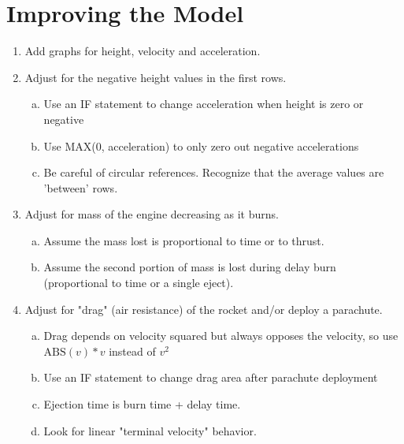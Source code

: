 \documentclass [12pt, letterpaper, titlepage] {article}
\begin{document}
\section*{Improving the Model}
\begin{enumerate}
        	\item{Add graphs for height, velocity and acceleration.}
	\item{Adjust for the negative height values in the first rows.}
	\begin{enumerate}[a.]
		\item{Use an IF statement to change acceleration when height is zero or negative}
		\item{Use MAX(0, acceleration) to only zero out negative accelerations}
		\item{Be careful of circular references. Recognize that the average values are 'between' rows.}
	\end{enumerate}
	\item{Adjust for mass of the engine decreasing as it burns.}
	\begin{enumerate}[a.]
		\item{Assume the mass lost is proportional to time or to thrust.}
		\item{Assume the second portion of mass is lost during delay burn (proportional to time or a single eject).}
	\end{enumerate}
	\item{Adjust for "drag" (air resistance) of the rocket and/or deploy a parachute.}
	\begin{enumerate}[a.]
		\item{Drag depends on velocity squared but always opposes the velocity, so use $\text{ABS}\left(v \right)*v$ instead of $v^2$}
		\item{Use an IF statement to change drag area after parachute deployment}
		\item{Ejection time is burn time + delay time.}
		\item{Look for linear "terminal velocity" behavior.}
	\end{enumerate}
\end{enumerate}
\end{document}
